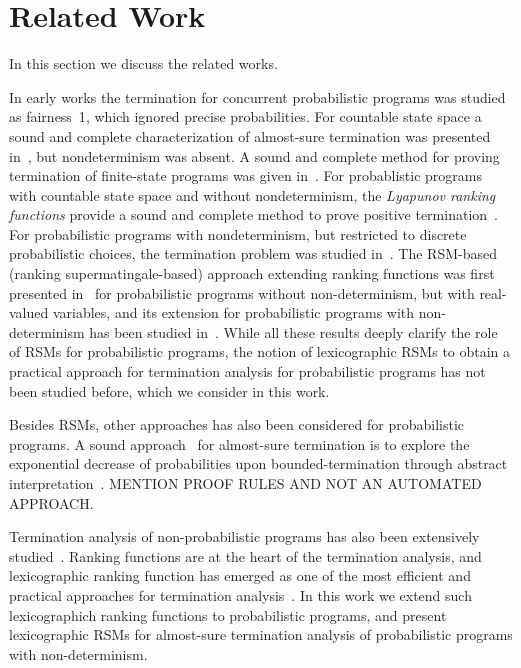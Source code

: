 
\section{Related Work}
In this section we discuss the related works.

\smallskip{}
In early works the termination for concurrent probabilistic programs was studied 
as fairness~1\cite{SPH84}, which ignored precise probabilities.
For countable state space a sound and complete characterization of almost-sure termination 
was presented in~\cite{HS85}, but nondeterminism was absent.
A sound and complete method for proving termination of finite-state programs
was given in~\cite{EGK12}.
For probablistic programs with countable state space and without 
nondeterminism, the {\em Lyapunov ranking functions} provide a sound and 
complete method to prove positive termination~\cite{BG05,Foster53}.
For probabilistic programs with nondeterminism, but restricted to discrete probabilistic
choices, the termination problem was studied in~\cite{MM04,MM05}.
The RSM-based (ranking supermatingale-based) approach extending ranking functions was first 
presented in~\cite{SriramCAV} for probabilistic programs without non-determinism,
but with real-valued variables, and its extension for probabilistic programs
with non-determinism has been studied in~\cite{HolgerPOPL,CFNH16:prob-termination,CAV-POLY,POPL,ARXIV}.
While all these results deeply clarify the role of RSMs for probabilistic programs, 
the notion of lexicographic RSMs to obtain a practical approach for termination 
analysis for probabilistic programs has not been studied before, which we consider in 
this work.


\smallskip{}
Besides RSMs, other approaches has also been considered for probabilistic programs.
A sound approach~\cite{DBLP:conf/sas/Monniaux01} for almost-sure termination 
is to explore the exponential decrease of probabilities upon bounded-termination 
through abstract interpretation~\cite{DBLP:conf/popl/CousotC77}.
MENTION PROOF RULES AND NOT AN AUTOMATED APPROACH.



\smallskip{}
Termination analysis of non-probabilistic programs has also been extensively 
studied~\cite{DBLP:conf/cav/BradleyMS05,DBLP:conf/tacas/ColonS01,DBLP:conf/vmcai/PodelskiR04,DBLP:conf/pods/SohnG91,BMS05b,CSZ13,LJB01}.
Ranking functions are at the heart of the termination analysis, and lexicographic 
ranking function has emerged as one of the most efficient and practical approaches
for termination analysis~\cite{}.
In this work we extend such lexicographich ranking functions to probabilistic programs,
and present lexicographic RSMs for almost-sure termination analysis of probabilistic programs
with non-determinism.




